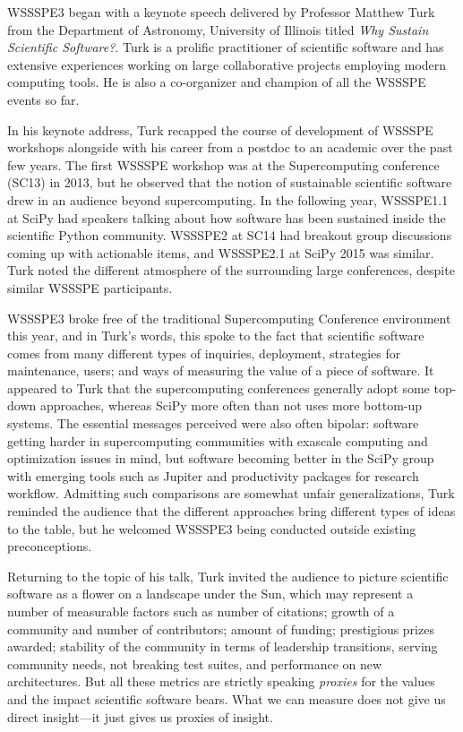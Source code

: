 \documentclass[11pt, oneside]{amsart}
\begin{document}
WSSSPE3 began with a keynote speech delivered by Professor Matthew Turk from the
Department of Astronomy, University of Illinois titled \emph{Why Sustain
Scientific Software?}. Turk is a prolific practitioner of scientific software
and has extensive experiences working on large collaborative projects employing
modern computing tools. He is also a co-organizer and champion of all the WSSSPE
events so far.

In his keynote address, Turk recapped the course of development of WSSSPE
workshops alongside with his career from a postdoc to an academic over the past
few years. The first WSSSPE workshop was at the Supercomputing conference (SC13)
in 2013, but he observed that the notion of sustainable scientific software drew
in an audience beyond supercomputing. In the following year, WSSSPE1.1 at SciPy
had speakers talking about how software has been sustained inside the scientific
Python community. WSSSPE2 at SC14 had breakout group discussions coming up with
actionable items, and WSSSPE2.1 at SciPy 2015 was similar. Turk noted the
different atmosphere of the surrounding large conferences, despite similar
WSSSPE participants.

WSSSPE3 broke free of the traditional Supercomputing Conference environment this
year, and in Turk's words, this spoke to the fact that scientific software comes
from many different types of inquiries, deployment, strategies for maintenance,
users; and ways of measuring the value of a piece of software. It appeared to
Turk that the supercomputing conferences generally adopt some top-down
approaches, whereas SciPy more often than not uses more bottom-up systems. The
essential messages perceived were also often bipolar: software getting harder in
supercomputing communities with exascale computing and optimization issues in
mind, but software becoming better in the SciPy group with emerging tools such
as Jupiter and productivity packages for research workflow. Admitting such
comparisons are somewhat unfair generalizations, Turk reminded the audience that
the different approaches bring different types of ideas to the table, but he
welcomed WSSSPE3 being conducted outside existing preconceptions.

Returning to the topic of his talk, Turk invited the audience to picture
scientific software as a flower on a landscape under the Sun, which may
represent a number of measurable factors such as number of
citations; growth of a community and number of contributors; amount of funding;
prestigious prizes awarded; stability of the community in terms of leadership
transitions, serving community needs, not breaking test suites, and performance
on new architectures. But all these metrics are strictly speaking \emph{proxies}
for the values and the impact scientific software bears. What we can measure
does not give us direct insight---it just gives us proxies of insight.
  
\end{document}
